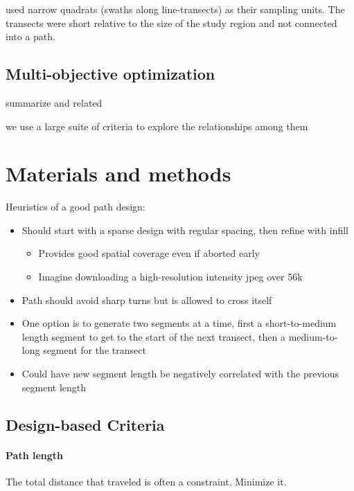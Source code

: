 \documentclass[review]{elsarticle}
\begin{document}
\citet{liuvanhatalo} used narrow quadrats (swaths along line-transects) as
their sampling units. The transects were short relative to the size of the
study region and not connected into a path.


\subsection{Multi-objective optimization}

summarize \citet{lark} and related

we use a large suite of criteria to explore the relationships among them


\section{Materials and methods}

Heuristics of a good path design:
\begin{itemize}
\item Should start with a sparse design with regular spacing, then refine with
infill
\begin{itemize}
\item Provides good spatial coverage even if aborted early
\item Imagine downloading a high-resolution intensity jpeg over 56k
\end{itemize}
\item Path should avoid sharp turns but is allowed to cross itself
\item One option is to generate two segments at a time, first a short-to-medium
length segment to get to the start of the next transect, then a  medium-to-long
segment for the transect
\item Could have new segment length be negatively correlated with the previous
segment length
\end{itemize}


\subsection{Design-based Criteria}

\paragraph{Path length}
The total distance that traveled is often a constraint. Minimize it.
\end{document}
